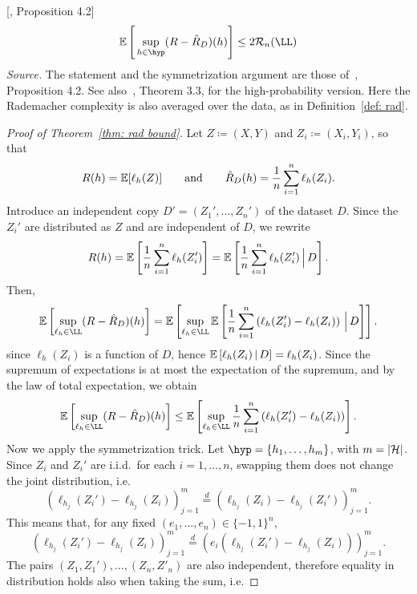\documentclass[reqno]{amsart}
\begin{document}
\begin{theorem}\label{thm: rad bound} [\cite{bach2024learning}, Proposition 4.2]
\[
\expv\left[\,\sup_{h \in \hyp}(R - \hat R_D)(h)\right]
\le 2 \mathcal R_n(\LL)
\]
\textnormal{\emph{Source.} The statement and the symmetrization argument are those of~\cite{bach2024learning}, Proposition 4.2. See also~\cite{mohri2018foundations}, Theorem 3.3, for the high-probability version. Here the Rademacher complexity is also averaged over the data, as in Definition~\ref{def: rad}.}

\begin{proof}[Proof of Theorem~\ref{thm: rad bound}]
Let $Z\coloneq(X,Y)$ and $Z_i\coloneq(X_i,Y_i)$, so that
\[
R(h) = \mathbb{E}[\ell_h(Z)] \qquad \text{and} \qquad \hat R_D(h) = \frac1n\sum_{i=1}^n \ell_h(Z_i).
\]
Introduce an independent copy $D'=(Z_1',\ldots,Z_n')$ of the dataset $D$.
Since the $Z_i'$ are distributed as $Z$ and are independent of $D$, we rewrite
\[
R(h) = \mathbb{E}\left[\frac1n\sum_{i=1}^n \ell_h(Z_i')\right] = \mathbb{E}\left[\frac1n\sum_{i=1}^n \ell_h(Z_i')\,\Big\vert\, D\right].
\]
Then,
\[
\expv\left[\sup_{\ell_h\in\LL}(R-\hat R_D)(h)\right] = \expv\left[\sup_{\ell_h\in\LL} \expv\left[\frac1n\sum_{i=1}^n \left(\ell_h(Z_i')-\ell_h(Z_i)\right)\,\Big\vert\, D\right]\right].
\]
since $\ell_h(Z_i)$ is a function of $D$, hence $\mathbb{E}\left[\ell_h(Z_i)\,\vert\, D\right] = \ell_h(Z_i)$.
Since the supremum of expectations is at most the expectation of the supremum, and by the law of total expectation, we obtain
\begin{equation}\label{app/eq: sym step1}
\expv\left[\sup_{\ell_h\in\LL}(R-\hat R_D)(h)\right] \le \expv\left[\sup_{\ell_h\in\LL}\frac1n\sum_{i=1}^n \left(\ell_h(Z_i')-\ell_h(Z_i)\right)\right].
\end{equation}
Now we apply the symmetrization trick. Let $\hyp = \{h_1,\ldots,h_m\}$, with $m = \vert\mathcal{H}\vert$. Since $Z_i$ and $Z_i'$ are i.i.d.\ for each $i=1,\ldots,n$, swapping them does not change the joint distribution, i.e.
\[
\left(\ell_{h_j}(Z_i')-\ell_{h_j}(Z_i)\right)_{j=1}^m \overset{d}{=} \left(\ell_{h_j}(Z_i)-\ell_{h_j}(Z_i')\right)_{j=1}^m.
\]
This means that, for any fixed $(e_1,\ldots,e_n)\in\{-1,1\}^n$,
\[
\left(\ell_{h_j}(Z_i')-\ell_{h_j}(Z_i)\right)_{j=1}^m \overset{d}{=} \left(e_i\left(\ell_{h_j}(Z_i')-\ell_{h_j}(Z_i)\right)\right)_{j=1}^m.
\]
The pairs $(Z_1,Z_1'),\ldots,(Z_n,Z'_n)$ are also independent, therefore equality in distribution holds also when taking the sum, i.e.

\end{proof}
\end{theorem}
\end{document}
